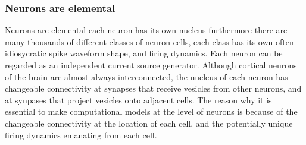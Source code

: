\subsubsection{Neurons are elemental}%
Neurons are elemental each neuron has its own nucleus furthermore there are many thousands of different classes of neuron cells, each class has its own often idiosycratic spike waveform shape, and firing dynamics. Each neuron can be regarded as an independent current source generator. Although cortical neurons of the brain are almost always interconnected, the nucleus of each neuron has changeable connectivity at synapses that receive vesicles from other neurons, and at synpases that project vesicles onto adjacent cells. The reason why it is essential to make computational models at the level of neurons is because of the changeable connectivity at the location of each cell, and the potentially unique firing dynamics emanating from each cell.\\
\\

